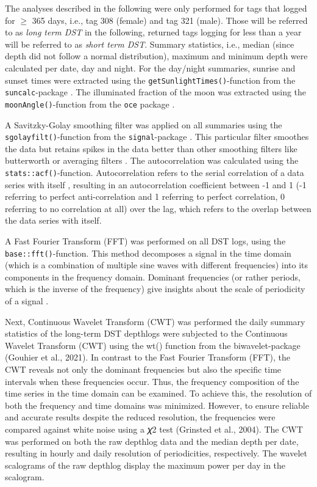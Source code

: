 \documentclass[
  authoryear,
  review,
  3p]{elsarticle}
\begin{document}
The analyses described in the following were only performed for tags
that logged for \(\geq\) 365 days, i.e., tag 308 (female) and tag 321
(male). Those will be referred to as \emph{long term DST} in the
following, returned tags logging for less than a year will be referred
to as \emph{short term DST}. Summary statistics, i.e., median (since
depth did not follow a normal distribution), maximum and minimum depth
were calculated per date, day and night. For the day/night summaries,
sunrise and sunset times were extracted using the
\texttt{getSunlightTimes()}-function from the \texttt{suncalc}-package
\citep{suncalc}. The illuminated fraction of the moon was extracted
using the \texttt{moonAngle()}-function from the \texttt{oce} package
\citep{oce}.

A Savitzky-Golay smoothing filter \citep[ filter order \emph{p = 1},
filter length \emph{n = 5}]{press_1990} was applied on all summaries
using the \texttt{sgolayfilt()}-function from the
\texttt{signal}-package \citep{signal}. This particular filter smoothes
the data but retains spikes in the data better than other smoothing
filters like butterworth or averaging filters \citep[like rolling
mean,][]{schafer_2011}. The autocorrelation was calculated using the
\texttt{stats::acf()}-function. Autocorrelation refers to the serial
correlation of a data series with itself \citep{bartlett_1946},
resulting in an autocorrelation coefficient between -1 and 1 (-1
referring to perfect anti-correlation and 1 referring to perfect
correlation, 0 referring to no correlation at all) over the lag, which
refers to the overlap between the data series with itself.

A Fast Fourier Transform (FFT) was performed on all DST logs, using the
\texttt{base::fft()}-function. This method decomposes a signal in the
time domain (which is a combination of multiple sine waves with
different frequencies) into its components in the frequency domain.
Dominant frequencies (or rather periods, which is the inverse of the
frequency) give insights about the scale of periodicity of a signal
\citep[in the present case the signal is the depth-timeseries of the
sharks,][]{cochran_1967}.

Next, Continuous Wavelet Transform (CWT) was performed the daily summary
statistics of the long-term DST depthlogs were subjected to the
Continuous Wavelet Transform (CWT) using the wt() function from the
biwavelet-package (Gouhier et al., 2021). In contrast to the Fast
Fourier Transform (FFT), the CWT reveals not only the dominant
frequencies but also the specific time intervals when these frequencies
occur. Thus, the frequency composition of the time series in the time
domain can be examined. To achieve this, the resolution of both the
frequency and time domains was minimized. However, to ensure reliable
and accurate results despite the reduced resolution, the frequencies
were compared against white noise using a 𝜒2 test (Grinsted et al.,
2004). The CWT was performed on both the raw depthlog data and the
median depth per date, resulting in hourly and daily resolution of
periodicities, respectively. The wavelet scalograms of the raw depthlog
display the maximum power per day in the scalogram.
\end{document}
